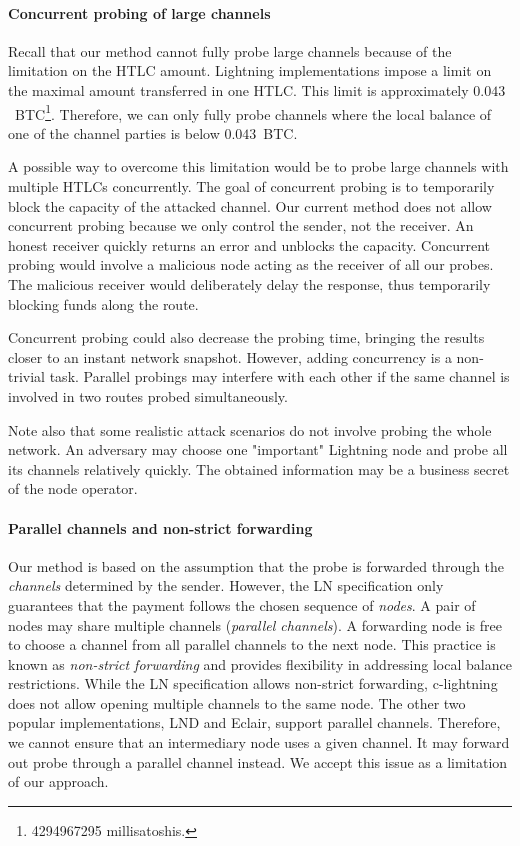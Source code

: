 \paragraph{Concurrent probing of large channels}

Recall that our method cannot fully probe large channels because of the limitation on the HTLC amount.
Lightning implementations impose a limit on the maximal amount transferred in one HTLC\@.
This limit is approximately $0.043$~BTC\footnote{4294967295 millisatoshis.}.
Therefore, we can only fully probe channels where the local balance of one of the channel parties is below $0.043$~BTC\@.

A possible way to overcome this limitation would be to probe large channels with multiple HTLCs concurrently.
The goal of concurrent probing is to temporarily block the capacity of the attacked channel.
Our current method does not allow concurrent probing because we only control the sender, not the receiver.
An honest receiver quickly returns an error and unblocks the capacity.
Concurrent probing would involve a malicious node acting as the receiver of all our probes.
The malicious receiver would deliberately delay the response, thus temporarily blocking funds along the route.

Concurrent probing could also decrease the probing time, bringing the results closer to an instant network snapshot.
However, adding concurrency is a non-trivial task.
Parallel probings may interfere with each other if the same channel is involved in two routes probed simultaneously.

Note also that some realistic attack scenarios do not involve probing the whole network.
An adversary may choose one "important" Lightning node and probe all its channels relatively quickly.
The obtained information may be a business secret of the node operator.

\paragraph{Parallel channels and non-strict forwarding}

Our method is based on the assumption that the probe is forwarded through the \textit{channels} determined by the sender.
However, the LN specification only guarantees that the payment follows the chosen sequence of \textit{nodes}.
A pair of nodes may share multiple channels (\textit{parallel channels}).
A forwarding node is free to choose a channel from all parallel channels to the next node.
This practice is known as \textit{non-strict forwarding} and provides flexibility in addressing local balance restrictions.
While the LN specification allows non-strict forwarding, c-lightning does not allow opening multiple channels to the same node.
The other two popular implementations, LND and Eclair, support parallel channels.
Therefore, we cannot ensure that an intermediary node uses a given channel.
It may forward out probe through a parallel channel instead.
We accept this issue as a limitation of our approach.

